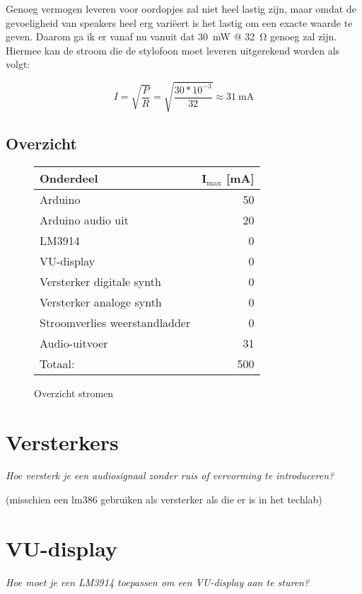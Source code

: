 \documentclass[12pt, a4paper, dutch]{article}
\newcommand{\sub}[1]{$_{\text{#1}}$}
\begin{document}
Genoeg vermogen leveren voor oordopjes zal niet heel lastig zijn, maar omdat de
gevoeligheid van speakers heel erg vari\"eert is het lastig om een exacte waarde te
geven. Daarom ga ik er vanaf nu vanuit dat \SI{30}{\milli\watt} @ \SI{32}{\ohm}
genoeg zal zijn. Hiermee kan de stroom die de stylofoon moet leveren uitgerekend
worden als volgt:

\[
I=\sqrt{\frac{P}{R}} = \sqrt{\frac{30*10^{-3}}{32}} \approx \SI{31}{\milli\ampere}
\]

\subsection{Overzicht}

\begin{figure}[H]
\centering
\begin{tabular}{lr}
\toprule
Onderdeel & I\sub{max} [\si{\milli\ampere}]\\
\midrule
Arduino & \num{50} \\
Arduino audio uit & \num{20} \\
LM3914 & \num{0} \\
VU-display & \num{0} \\
Versterker digitale synth & \num{0} \\
Versterker analoge synth & \num{0} \\
Stroomverlies weerstandladder & \num{0} \\
Audio-uitvoer & \num{31} \\
\midrule
\hfill Totaal: & \num{500} \\
\bottomrule
\end{tabular}
\caption{Overzicht stromen}
\end{figure}

\section{Versterkers}

\textit{Hoe versterk je een audiosignaal zonder ruis of vervorming te introduceren?}

(misschien een lm386 gebruiken als versterker als die er is in het techlab)

\section{VU-display}

\textit{Hoe moet je een LM3914 toepassen om een VU-display aan te sturen?}
\end{document}
